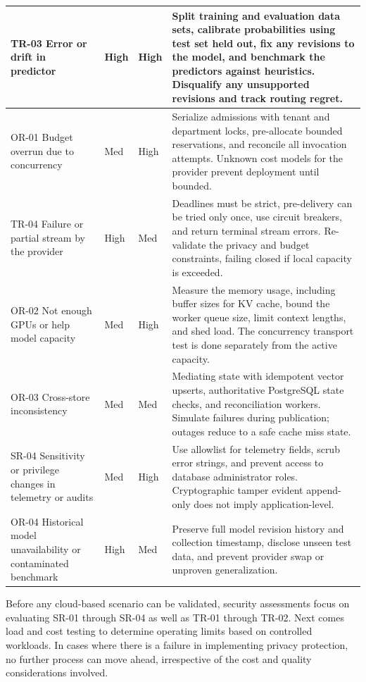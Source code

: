 \documentclass{FastFyp}
\begin{document}
\begin{longtable}{|P{3.1cm}|P{1.1cm}|P{1.2cm}|P{8.8cm}|}
TR-03 Error or drift in predictor & High & High & Split training and evaluation data sets, calibrate probabilities using test set held out, fix any revisions to the model, and benchmark the predictors against heuristics. Disqualify any unsupported revisions and track routing regret.\\\hline
OR-01 Budget overrun due to concurrency & Med & High & Serialize admissions with tenant and department locks, pre-allocate bounded reservations, and reconcile all invocation attempts. Unknown cost models for the provider prevent deployment until bounded.\\\hline
TR-04 Failure or partial stream by the provider & High & Med & Deadlines must be strict, pre-delivery can be tried only once, use circuit breakers, and return terminal stream errors. Re-validate the privacy and budget constraints, failing closed if local capacity is exceeded.\\\hline
OR-02 Not enough GPUs or help model capacity & Med & High & Measure the memory usage, including buffer sizes for KV cache, bound the worker queue size, limit context lengths, and shed load. The concurrency transport test is done separately from the active capacity.\\\hline
OR-03 Cross-store inconsistency & Med & Med & Mediating state with idempotent vector upserts, authoritative PostgreSQL state checks, and reconciliation workers. Simulate failures during publication; outages reduce to a safe cache miss state.\\\hline
SR-04 Sensitivity or privilege changes in telemetry or audits & Med & High & Use allowlist for telemetry fields, scrub error strings, and prevent access to database administrator roles. Cryptographic tamper evident append-only does not imply application-level.\\\hline
OR-04 Historical model unavailability or contaminated benchmark & High & Med & Preserve full model revision history and collection timestamp, disclose unseen test data, and prevent provider swap or unproven generalization.\\\hline
\end{longtable}\endgroup
Before any cloud-based scenario can be validated, security assessments focus on evaluating SR-01 through SR-04 as well as TR-01 through TR-02. Next comes load and cost testing to determine operating limits based on controlled workloads. In cases where there is a failure in implementing privacy protection, no further process can move ahead, irrespective of the cost and quality considerations involved.
\end{document}
